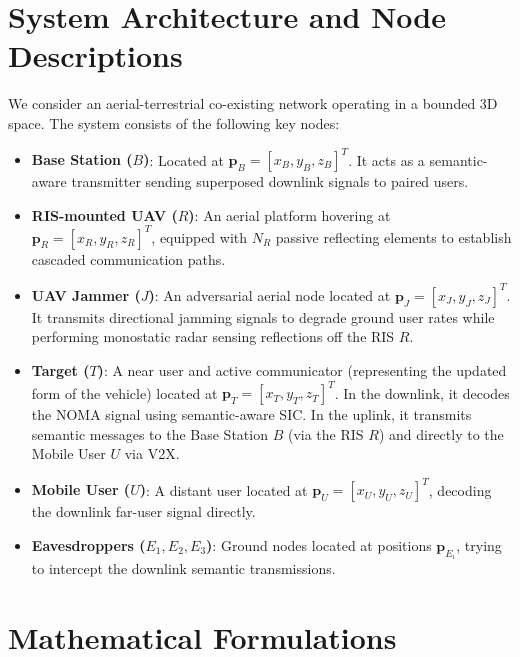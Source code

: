 \documentclass[journal,onecolumn]{IEEEtran}
\begin{document}
\section{System Architecture and Node Descriptions}
We consider an aerial-terrestrial co-existing network operating in a bounded 3D space. The system consists of the following key nodes:
\begin{itemize}
    \item \textbf{Base Station ($B$)}: Located at $\mathbf{p}_B = [x_B, y_B, z_B]^T$. It acts as a semantic-aware transmitter sending superposed downlink signals to paired users.
    \item \textbf{RIS-mounted UAV ($R$)}: An aerial platform hovering at $\mathbf{p}_R = [x_R, y_R, z_R]^T$, equipped with $N_R$ passive reflecting elements to establish cascaded communication paths.
    \item \textbf{UAV Jammer ($J$)}: An adversarial aerial node located at $\mathbf{p}_J = [x_J, y_J, z_J]^T$. It transmits directional jamming signals to degrade ground user rates while performing monostatic radar sensing reflections off the RIS $R$.
    \item \textbf{Target ($T$)}: A near user and active communicator (representing the updated form of the vehicle) located at $\mathbf{p}_T = [x_T, y_T, z_T]^T$. In the downlink, it decodes the NOMA signal using semantic-aware SIC. In the uplink, it transmits semantic messages to the Base Station $B$ (via the RIS $R$) and directly to the Mobile User $U$ via V2X.
    \item \textbf{Mobile User ($U$)}: A distant user located at $\mathbf{p}_U = [x_U, y_U, z_U]^T$, decoding the downlink far-user signal directly.
    \item \textbf{Eavesdroppers ($E_1, E_2, E_3$)}: Ground nodes located at positions $\mathbf{p}_{E_i}$, trying to intercept the downlink semantic transmissions.
\end{itemize}

\section{Mathematical Formulations}
\end{document}
